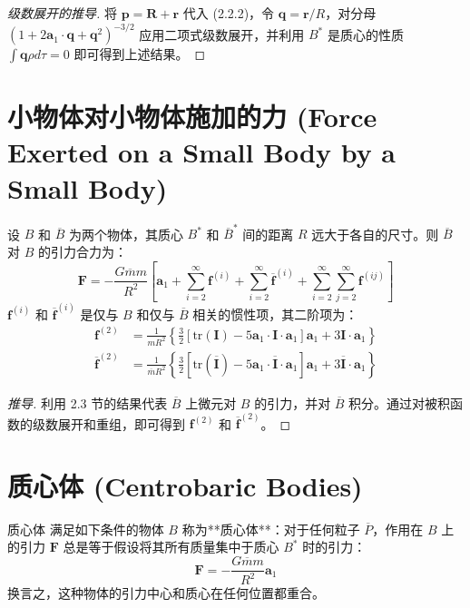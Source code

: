 \begin{proof}[级数展开的推导]
将 \(\mathbf{p} = \mathbf{R} + \mathbf{r}\) 代入 (2.2.2)，令 \(\mathbf{q} = \mathbf{r}/R\)，对分母 \((1 + 2\mathbf{a}_1\cdot\mathbf{q} + \mathbf{q}^2)^{-3/2}\) 应用二项式级数展开，并利用 \(B^*\) 是质心的性质 \(\int \mathbf{q}\rho d\tau = 0\) 即可得到上述结果。
\end{proof}

\section{小物体对小物体施加的力 (Force Exerted on a Small Body by a Small Body)}

设 \(B\) 和 \(\overline{B}\) 为两个物体，其质心 \(B^*\) 和 \(\overline{B}^*\) 间的距离 \(R\) 远大于各自的尺寸。则 \(\overline{B}\) 对 \(B\) 的引力合力为：
\begin{equation}
\mathbf{F} = -\frac{G\overline{m}m}{R^2}\left[\mathbf{a}_1 + \sum_{i=2}^{\infty}\mathbf{f}^{(i)} + \sum_{i=2}^{\infty}\overline{\mathbf{f}}^{(i)} + \sum_{i=2}^{\infty}\sum_{j=2}^{\infty}\mathbf{f}^{(ij)}\right] \tag{1}
\end{equation}
\(\mathbf{f}^{(i)}\) 和 \(\overline{\mathbf{f}}^{(i)}\) 是仅与 \(B\) 和仅与 \(\overline{B}\) 相关的惯性项，其二阶项为：
\begin{align}
\mathbf{f}^{(2)} &= \frac{1}{mR^2}\left\{\frac{3}{2}\left[\mathrm{tr}(\mathbf{I}) - 5\mathbf{a}_1\cdot \mathbf{I}\cdot \mathbf{a}_1\right]\mathbf{a}_1 + 3\mathbf{I}\cdot \mathbf{a}_1\right\} \tag{2} \\
\overline{\mathbf{f}}^{(2)} &= \frac{1}{\overline{m}R^2}\left\{\frac{3}{2}\left[\mathrm{tr}(\overline{\mathbf{I}}) - 5\mathbf{a}_1\cdot \overline{\mathbf{I}}\cdot \mathbf{a}_1\right]\mathbf{a}_1 + 3\overline{\mathbf{I}}\cdot \mathbf{a}_1\right\} \tag{3}
\end{align}

\begin{proof}[推导]
利用 2.3 节的结果代表 \(\overline{B}\) 上微元对 \(B\) 的引力，并对 \(\overline{B}\) 积分。通过对被积函数的级数展开和重组，即可得到 \(\mathbf{f}^{(2)}\) 和 \(\overline{\mathbf{f}}^{(2)}\)。
\end{proof}

\section{质心体 (Centrobaric Bodies)}

\begin{mydefinition}{质心体}
满足如下条件的物体 \(B\) 称为**质心体**：对于任何粒子 \(\overline{P}\)，作用在 \(B\) 上的引力 \(\mathbf{F}\) 总是等于假设将其所有质量集中于质心 \(B^*\) 时的引力：
\begin{equation}
\mathbf{F} = -\frac{G\overline{m}m}{R^2}\mathbf{a}_1 \tag{1}
\end{equation}
换言之，这种物体的引力中心和质心在任何位置都重合。
\end{mydefinition}

